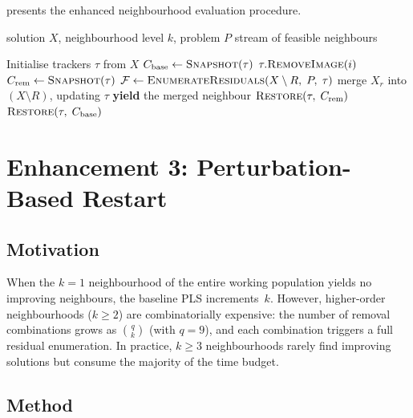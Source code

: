 \documentclass[11pt,a4paper]{article}
\newcommand{\calF}{\mathcal{F}}
\begin{document}
 presents the enhanced neighbourhood
evaluation procedure.

\begin{algorithm}[t]
\caption{Neighbourhood Iterator with Two-Level Checkpointing}
\label{alg:checkpoint_iter}
\begin{algorithmic}[1]
\Input solution $X$, neighbourhood level $k$, problem $P$
\Output stream of feasible neighbours

\State Initialise trackers $\tau$ from $X$
\State $C_{\mathrm{base}} \gets \textsc{Snapshot}(\tau)$
    \State $\tau.\textsc{RemoveImage}(i)$
  \EndFor
  \State $C_{\mathrm{rem}} \gets \textsc{Snapshot}(\tau)$
  \State $\calF \gets \textsc{EnumerateResiduals}(X \setminus R,\; P,\; \tau)$
  \ForEach{residual solution $X_r \in \calF$}
    \State merge $X_r$ into $(X \setminus R)$, updating $\tau$
    \State \textbf{yield} the merged neighbour
    \State $\textsc{Restore}(\tau,\; C_{\mathrm{rem}})$
  \EndFor
  \State $\textsc{Restore}(\tau,\; C_{\mathrm{base}})$
\EndFor
\end{algorithmic}
\end{algorithm}

\section{Enhancement 3: Perturbation-Based Restart}
\label{sec:perturb}

\subsection{Motivation}

When the $k{=}1$ neighbourhood of the entire working population yields
no improving neighbours, the baseline PLS increments~$k$.  However,
higher-order neighbourhoods ($k{\ge}2$) are combinatorially expensive:
the number of removal combinations grows as $\binom{q}{k}$ (with
$q{=}9$), and each combination triggers a full residual enumeration.
In practice, $k{\ge}3$ neighbourhoods rarely find improving solutions but
consume the majority of the time budget.

\subsection{Method}
\end{document}
